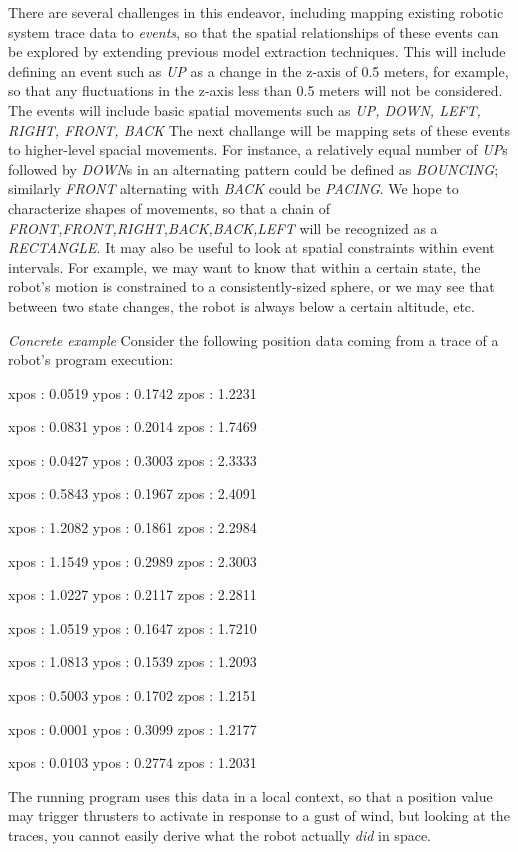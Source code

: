 \documentclass{article}
\begin{document}
There are several challenges in this endeavor, including mapping existing robotic system trace data to \emph{events}, so that the spatial relationships of these events can be explored by extending previous model extraction techniques. 
This will include defining an event such as \emph{UP} as a change in the z-axis of 0.5 meters, for example, so that any fluctuations in the z-axis less than 0.5 meters will not be considered.  
The events will include basic spatial movements such as \emph{UP, DOWN, LEFT, RIGHT, FRONT, BACK} 
The next challange will be mapping sets of these events to higher-level spacial movements.  
For instance, a relatively equal number of \emph{UP}s followed by \emph{DOWN}s in an alternating pattern could be defined as \emph{BOUNCING}; similarly \emph{FRONT} alternating with \emph{BACK} could be \emph{PACING}.
We hope to characterize shapes of movements, so that a chain of \emph{FRONT,FRONT,RIGHT,BACK,BACK,LEFT} will be recognized as a \emph{RECTANGLE}.
It may also be useful to look at spatial constraints within event intervals.  
For example, we may want to know that within a certain state, the robot's motion is constrained to a consistently-sized sphere, or we may see that between two state changes, the robot is always below a certain altitude, etc.

\emph{Concrete example}
Consider the following position data coming from a trace of a robot's program execution:


xpos : 0.0519  ypos : 0.1742  zpos : 1.2231

xpos : 0.0831  ypos : 0.2014  zpos : 1.7469

xpos : 0.0427  ypos : 0.3003  zpos : 2.3333

xpos : 0.5843  ypos : 0.1967  zpos : 2.4091

xpos : 1.2082  ypos : 0.1861  zpos : 2.2984

xpos : 1.1549  ypos : 0.2989  zpos : 2.3003

xpos : 1.0227  ypos : 0.2117  zpos : 2.2811

xpos : 1.0519  ypos : 0.1647  zpos : 1.7210

xpos : 1.0813  ypos : 0.1539  zpos : 1.2093

xpos : 0.5003  ypos : 0.1702  zpos : 1.2151

xpos : 0.0001  ypos : 0.3099  zpos : 1.2177

xpos : 0.0103  ypos : 0.2774  zpos : 1.2031

The running program uses this data in a local context, so that a position value may trigger thrusters to activate in response to a gust of wind, but looking at the traces, you cannot easily derive what the robot actually \emph{did} in space.
\end{document}
